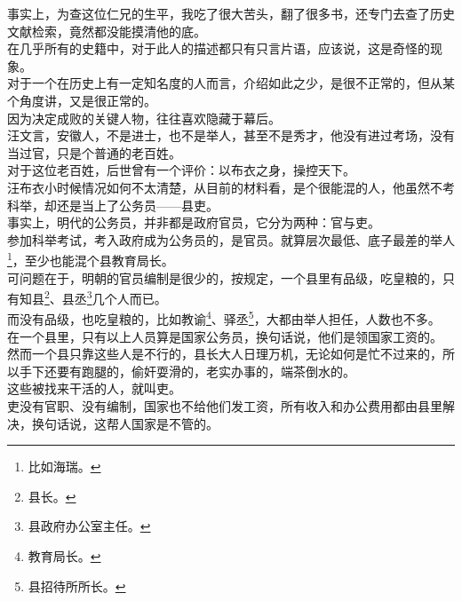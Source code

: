 \begin{multicols}{\theparacolNo}
事实上，为查这位仁兄的生平，我吃了很大苦头，翻了很多书，还专门去查了历史文献检索，竟然都没能摸清他的底。\\

在几乎所有的史籍中，对于此人的描述都只有只言片语，应该说，这是奇怪的现象。\\

对于一个在历史上有一定知名度的人而言，介绍如此之少，是很不正常的，但从某个角度讲，又是很正常的。\\

因为决定成败的关键人物，往往喜欢隐藏于幕后。\\

汪文言，安徽人，不是进士，也不是举人，甚至不是秀才，他没有进过考场，没有当过官，只是个普通的老百姓。\\

对于这位老百姓，后世曾有一个评价：以布衣之身，操控天下。\\

汪布衣小时候情况如何不太清楚，从目前的材料看，是个很能混的人，他虽然不考科举，却还是当上了公务员——县吏。\\

事实上，明代的公务员，并非都是政府官员，它分为两种：官与吏。\\

参加科举考试，考入政府成为公务员的，是官员。就算层次最低、底子最差的举人\footnote{比如海瑞。}，至少也能混个县教育局长。\\

可问题在于，明朝的官员编制是很少的，按规定，一个县里有品级，吃皇粮的，只有知县\footnote{县长。}、县丞\footnote{县政府办公室主任。}几个人而已。\\

而没有品级，也吃皇粮的，比如教谕\footnote{教育局长。}、驿丞\footnote{县招待所所长。}，大都由举人担任，人数也不多。\\

在一个县里，只有以上人员算是国家公务员，换句话说，他们是领国家工资的。\\

然而一个县只靠这些人是不行的，县长大人日理万机，无论如何是忙不过来的，所以手下还要有跑腿的，偷奸耍滑的，老实办事的，端茶倒水的。\\

这些被找来干活的人，就叫吏。\\

吏没有官职、没有编制，国家也不给他们发工资，所有收入和办公费用都由县里解决，换句话说，这帮人国家是不管的。\\


\end{multicols}
